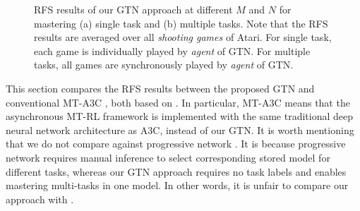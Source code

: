 \documentclass[letterpaper]{article} %
\begin{document}
\begin{figure}
  \centering
  \caption{RFS results of our GTN approach at different $M$ and $N$ for mastering (a) single task and (b) multiple tasks. Note that the RFS results are averaged over all \textit{shooting games} of Atari. For single task, each game is individually played by \textit{agent} of GTN. For multiple tasks, all games are synchronously played by \textit{agent} of GTN.
  }
\end{figure}

This section compares the RFS results between the proposed GTN and conventional MT-A3C \cite{romoff2016deep}, both based on \cite{mnih2016asynchronous}. In particular, MT-A3C means that the asynchronous MT-RL framework is implemented with the same traditional deep neural network architecture as A3C, instead of our GTN.
It is worth mentioning that we do not compare against progressive network \cite{rusu2016progressive}. It is because progressive network \cite{rusu2016progressive} requires manual inference to select corresponding stored model for different tasks, whereas our GTN approach requires no task labels and enables mastering multi-tasks in one model. In other words, it is unfair to compare our approach with \cite{rusu2016progressive}.
\end{document}
